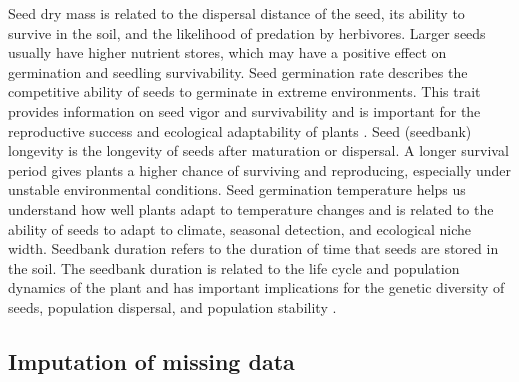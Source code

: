 \documentclass[a4paper, 11, margin=2cm]{article}
\begin{document}
    Seed dry mass is related to the dispersal distance of the seed, its ability to survive in the soil, and the likelihood of predation by herbivores. Larger seeds usually have higher nutrient stores, which may have a positive effect on germination and seedling survivability. Seed germination rate describes the competitive ability of seeds to germinate in extreme environments. This trait provides information on seed vigor and survivability and is important for the reproductive success and ecological adaptability of plants \citep{jimenez2016seed}. Seed (seedbank) longevity is the longevity of seeds after maturation or dispersal. A longer survival period gives plants a higher chance of surviving and reproducing, especially under unstable environmental conditions. Seed germination temperature helps us understand how well plants adapt to temperature changes and is related to the ability of seeds to adapt to climate, seasonal detection, and ecological niche width. Seedbank duration refers to the duration of time that seeds are stored in the soil. The seedbank duration is related to the life cycle and population dynamics of the plant and has important implications for the genetic diversity of seeds, population dispersal, and population stability \citep{jimenez2016seed}.

    \subsection{Imputation of missing data}
\end{document}
